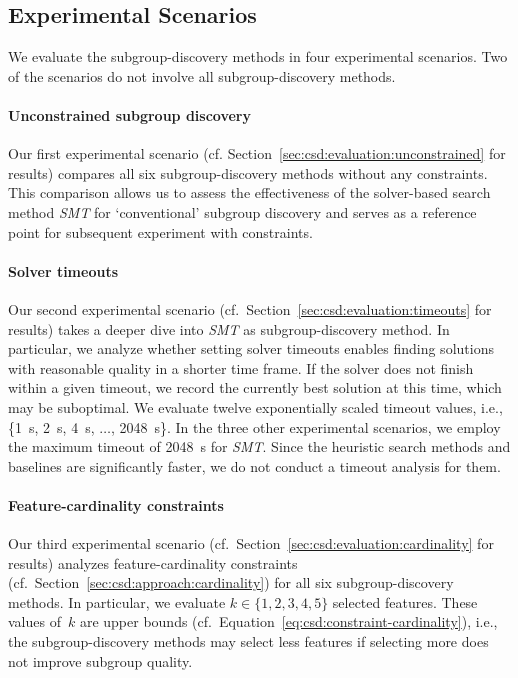 \documentclass{article}
\theoremstyle{definition}
\begin{document}
\subsection{Experimental Scenarios}
\label{sec:csd:experimental-design:scenarios}

We evaluate the subgroup-discovery methods in four experimental scenarios.
Two of the scenarios do not involve all subgroup-discovery methods.

\paragraph{Unconstrained subgroup discovery}

Our first experimental scenario (cf. Section~\ref{sec:csd:evaluation:unconstrained} for results) compares all six subgroup-discovery methods without any constraints.
This comparison allows us to assess the effectiveness of the solver-based search method \emph{SMT} for `conventional' subgroup discovery and serves as a reference point for subsequent experiment with constraints.

\paragraph{Solver timeouts}

Our second experimental scenario (cf.~Section~\ref{sec:csd:evaluation:timeouts} for results) takes a deeper dive into \emph{SMT} as subgroup-discovery method.
In particular, we analyze whether setting solver timeouts enables finding solutions with reasonable quality in a shorter time frame.
If the solver does not finish within a given timeout, we record the currently best solution at this time, which may be suboptimal.
We evaluate twelve exponentially scaled timeout values, i.e., \{1~s, 2~s, 4~s, $\dots$, 2048~s\}.
In the three other experimental scenarios, we employ the maximum timeout of 2048~s for \emph{SMT}.
Since the heuristic search methods and baselines are significantly faster, we do not conduct a timeout analysis for them.

\paragraph{Feature-cardinality constraints}

Our third experimental scenario (cf.~Section~\ref{sec:csd:evaluation:cardinality} for results) analyzes feature-cardinality constraints (cf.~Section~\ref{sec:csd:approach:cardinality}) for all six subgroup-discovery methods.
In particular, we evaluate $k \in \{1, 2, 3, 4, 5\}$ selected features.
These values of~$k$ are upper bounds (cf.~Equation~\ref{eq:csd:constraint-cardinality}), i.e., the subgroup-discovery methods may select less features if selecting more does not improve subgroup quality.
\end{document}
